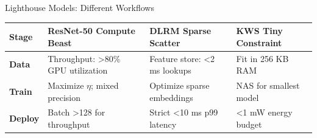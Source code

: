 \documentclass[aspectratio=169, 12pt]{beamer}
\begin{document}
\begin{frame}{Lighthouse Models: Different Workflows}
\note{
%
%
%
%
}

\scriptsize
\renewcommand{\arraystretch}{1.05}
\begin{tabular}{@{}lp{3.2cm}p{3.2cm}p{3.2cm}@{}}
  \toprule
  \textbf{Stage} & \textbf{ResNet-50} \newline\textcolor{computestroke}{Compute Beast} & \textbf{DLRM} \newline\textcolor{datastroke}{Sparse Scatter} & \textbf{KWS} \newline\textcolor{errorstroke}{Tiny Constraint} \\
  \midrule
  \textbf{Data}    & Throughput: >80\% GPU utilization  & Feature store: <2 ms lookups & Fit in 256 KB RAM \\
  \textbf{Train}   & Maximize $\eta$; mixed precision   & Optimize sparse embeddings   & NAS for smallest model \\
  \textbf{Deploy}  & Batch >128 for throughput          & Strict <10 ms p99 latency    & <1 mW energy budget \\
  \bottomrule
\end{tabular}

\vspace{0.1cm}
\small
{}

\end{frame}
\end{document}
